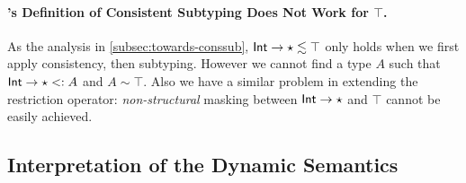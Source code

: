 
\paragraph{\citeauthor{siek2007gradual}'s Definition of Consistent Subtyping Does Not Work for $\top$.}

As the analysis in \cref{subsec:towards-conssub}, $\mathsf{Int} \to \star
\lesssim \top$ only holds when we first apply consistency, then subtyping.
However we cannot find a type $A$ such that
$\mathsf{Int} \to \star <: A$ and $A \sim \top$. Also we have a similar problem in
extending the restriction operator: \textit{non-structural} masking between
$\mathsf{Int} \to \star$ and $\top$ cannot be easily achieved.




\subsection{Interpretation of the Dynamic Semantics}
\label{subsec:algo:discuss}

